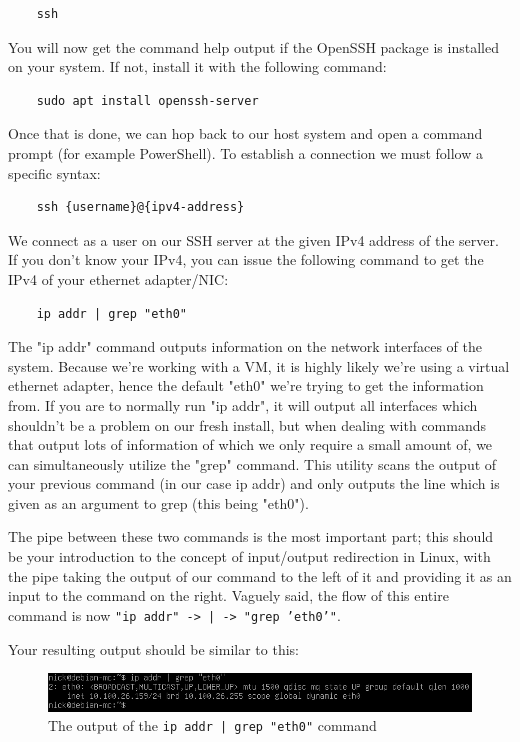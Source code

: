 \documentclass[]{article}
\begin{document}
\begin{verbatim}
	ssh
\end{verbatim}

You will now get the command help output if the OpenSSH package is installed on your system. If not, install it with the following command:

\begin{verbatim}
	sudo apt install openssh-server
\end{verbatim}

Once that is done, we can hop back to our host system and open a command prompt (for example PowerShell). To establish a connection we must follow a specific syntax:

\begin{verbatim}
	ssh {username}@{ipv4-address}
\end{verbatim}

We connect as a user on our SSH server at the given IPv4 address of the server. If you don't know your IPv4, you can issue the following command to get the IPv4 of your ethernet adapter/NIC:

\begin{verbatim}
	ip addr | grep "eth0"
\end{verbatim}

The "ip addr" command outputs information on the network interfaces of the system. Because we're working with a VM, it is highly likely we're using a virtual ethernet adapter, hence the default "eth0" we're trying to get the information from. If you are to normally run "ip addr", it will output all interfaces which shouldn't be a problem on our fresh install, but when dealing with commands that output lots of information of which we only require a small amount of, we can simultaneously utilize the "grep" command. This utility scans the output of your previous command (in our case ip addr) and only outputs the line which is given as an argument to grep (this being "eth0").

The pipe between these two commands is the most important part; this should be your introduction to the concept of input/output redirection in Linux, with the pipe taking the output of our command to the left of it and providing it as an input to the command on the right. Vaguely said, the flow of this entire command is now \texttt{"ip addr" -> | -> "grep 'eth0'"}.

Your resulting output should be similar to this:

\begin{figure}[h!]
	\caption{The output of the \texttt{ip addr | grep "eth0"} command}
	\centering
	\includegraphics[width=1\textwidth]{ip-addr}
\end{figure}
\FloatBarrier
\end{document}
